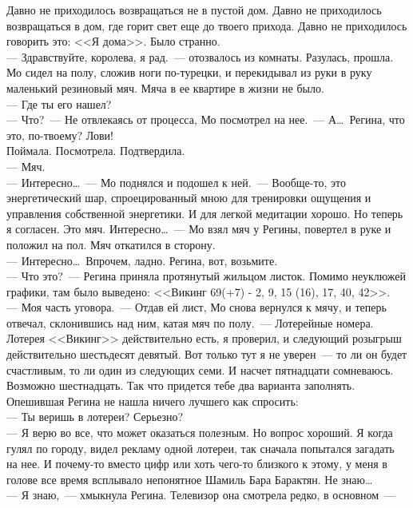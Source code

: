 Давно не приходилось возвращаться не в пустой дом. Давно не приходилось 
возвращаться в дом, где горит свет еще до твоего прихода. Давно не приходилось 
говорить это: <<Я дома>>. Было странно.\\
--- Здравствуйте, королева, я рад.~--- отозвалось из комнаты. Разулась, прошла. 
Мо сидел на полу, сложив ноги по-турецки, и перекидывал из руки в руку 
маленький резиновый мяч. Мяча в ее квартире в жизни не было.\\
--- Где ты его нашел?\\
--- Что?~--- Не отвлекаясь от процесса, Мо посмотрел на нее.~--- А\ldots\ 
Регина, что это, по-твоему? Лови!\\
Поймала. Посмотрела. Подтвердила.\\
--- Мяч.\\
--- Интересно\ldots~--- Мо поднялся и подошел к ней.~--- Вообще-то, это 
энергетический шар, спроецированный мною для тренировки ощущения и управления 
собственной энергетики. И для легкой медитации хорошо. Но теперь я согласен. 
Это мяч. Интересно\ldots~--- Мо взял мяч у Регины, повертел в руке и положил на 
пол. Мяч откатился в сторону.\\
--- Интересно\ldots\ Впрочем, ладно. Регина, вот, возьмите.\\
--- Что это?~--- Регина приняла протянутый жильцом листок. Помимо неуклюжей 
графики, там было выведено: <<Викинг 69(+7) - 2, 9, 15 (16), 17, 40, 42>>.\\
--- Моя часть уговора.~--- Отдав ей лист, Мо снова вернулся к мячу, и теперь 
отвечал, склонившись над ним, катая мяч по полу.~--- Лотерейные номера. Лотерея 
<<Викинг>> действительно есть, я проверил, и следующий розыгрыш действительно 
шестьдесят девятый. Вот только тут я не уверен~--- то ли он будет счастливым, 
то ли один из следующих семи. И насчет пятнадцати сомневаюсь. Возможно 
шестнадцать. Так что придется тебе два варианта заполнять.\\
Опешившая Регина не нашла ничего лучшего как спросить:\\
--- Ты веришь в лотереи? Серьезно?\\
--- Я верю во все, что может оказаться полезным. Но вопрос хороший. Я когда 
гулял по городу, видел рекламу одной лотереи, так сначала попытался загадать на 
нее. И почему-то вместо цифр или хоть чего-то близкого к этому, у меня в голове 
все время всплывало непонятное Шамиль Бара Барактян. Не знаю\ldots\\
--- Я знаю,~--- хмыкнула Регина. Телевизор она смотрела редко, в основном~--- 
